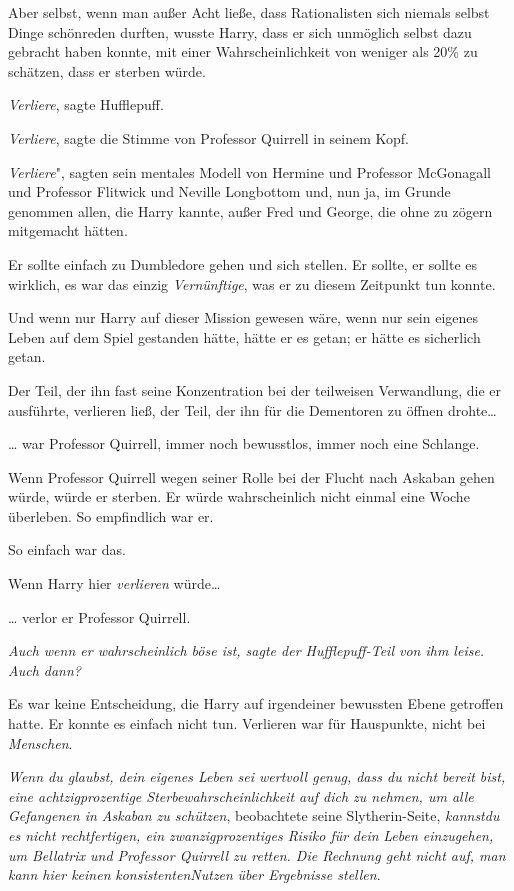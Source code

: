 {Aber selbst, wenn man außer Acht ließe, dass Rationalisten sich niemals selbst Dinge schönreden durften, wusste Harry, dass er sich unmöglich selbst dazu gebracht haben konnte, mit einer Wahrscheinlichkeit von weniger als 20\% zu schätzen, dass er sterben würde.

\emph{Verliere}, sagte Hufflepuff.

\emph{Verliere}, sagte die Stimme von Professor Quirrell in seinem Kopf.

\emph{Verliere}", sagten sein mentales Modell von Hermine und Professor McGonagall und Professor Flitwick und Neville Longbottom und, nun ja, im Grunde genommen allen, die Harry kannte, außer Fred und George, die ohne zu zögern mitgemacht hätten.

Er sollte einfach zu Dumbledore gehen und sich stellen. Er sollte, er sollte es wirklich, es war das einzig \emph{Vernünftige}, was er zu diesem Zeitpunkt tun konnte.

Und wenn nur Harry auf dieser Mission gewesen wäre, wenn nur sein eigenes Leben auf dem Spiel gestanden hätte, hätte er es getan; er hätte es sicherlich getan.

Der Teil, der ihn fast seine Konzentration bei der teilweisen Verwandlung, die er ausführte, verlieren ließ, der Teil, der ihn für die Dementoren zu öffnen drohte…

… war Professor Quirrell, immer noch bewusstlos, immer noch eine Schlange.

Wenn Professor Quirrell wegen seiner Rolle bei der Flucht nach Askaban gehen würde, würde er sterben. Er würde wahrscheinlich nicht einmal eine Woche überleben. So empfindlich war er.

So einfach war das.

Wenn Harry hier \emph{verlieren} würde…

… verlor er Professor Quirrell.

\emph{\emph{Auch wenn er wahrscheinlich böse ist}, sagte der Hufflepuff-Teil von ihm leise. \emph{Auch dann?}}

Es war keine Entscheidung, die Harry auf irgendeiner bewussten Ebene getroffen hatte. Er konnte es einfach nicht tun. Verlieren war für Hauspunkte, nicht bei \emph{Menschen}.

\emph{Wenn du glaubst, dein eigenes Leben sei wertvoll genug, dass du nicht bereit bist, eine achtzigprozentige Sterbewahrscheinlichkeit auf dich zu nehmen, um alle Gefangenen in Askaban zu schützen}, beobachtete seine Slytherin-Seite, \emph{kannstdu} \emph{es nicht rechtfertigen, ein zwanzigprozentiges Risiko für} \emph{dein} \emph{Leben einzugehen, um Bellatrix und Professor Quirrell zu retten. Die Rechnung geht nicht auf, man kann hier keinen} \emph{konsistentenNutzen} \emph{über Ergebnisse stellen}.

}
